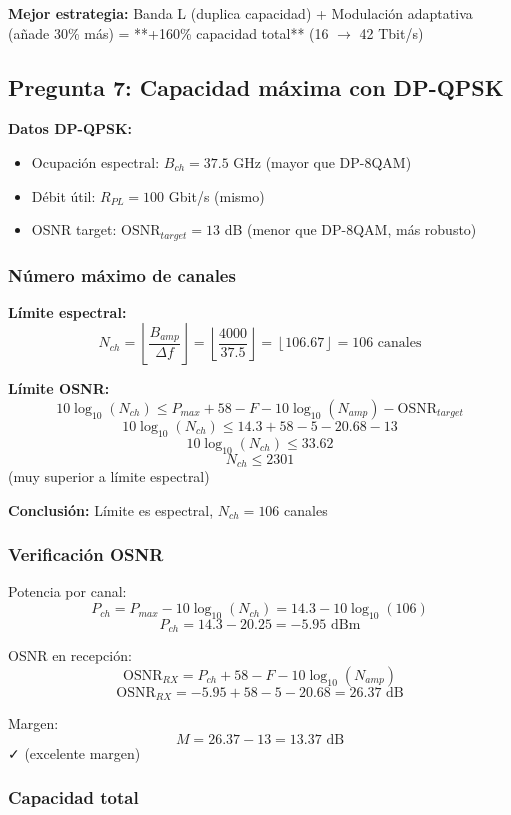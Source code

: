 \documentclass[a4paper,10pt]{article}
\begin{document}
\textbf{Mejor estrategia:} Banda L (duplica capacidad) + Modulación adaptativa (añade 30\% más) = **+160\% capacidad total** (16 $\rightarrow$ 42 Tbit/s)

\subsection{Pregunta 7: Capacidad máxima con DP-QPSK}

\textbf{Datos DP-QPSK:}
\begin{itemize}
    \item Ocupación espectral: $B_{ch} = 37.5$ GHz (mayor que DP-8QAM)
    \item Débit útil: $R_{PL} = 100$ Gbit/s (mismo)
    \item OSNR target: $\text{OSNR}_{target} = 13$ dB (menor que DP-8QAM, más robusto)
\end{itemize}

\subsubsection{Número máximo de canales}

\textbf{Límite espectral:}
$$N_{ch} = \left\lfloor \frac{B_{amp}}{\Delta f} \right\rfloor = \left\lfloor \frac{4000}{37.5} \right\rfloor = \left\lfloor 106.67 \right\rfloor = \boxed{106 \text{ canales}}$$

\textbf{Límite OSNR:}
$$10\log_{10}(N_{ch}) \leq P_{max} + 58 - F - 10\log_{10}(N_{amp}) - \text{OSNR}_{target}$$
$$10\log_{10}(N_{ch}) \leq 14.3 + 58 - 5 - 20.68 - 13$$
$$10\log_{10}(N_{ch}) \leq 33.62$$
$$N_{ch} \leq 2301$$ (muy superior a límite espectral)

\textbf{Conclusión:} Límite es espectral, $N_{ch} = 106$ canales

\subsubsection{Verificación OSNR}

Potencia por canal:
$$P_{ch} = P_{max} - 10\log_{10}(N_{ch}) = 14.3 - 10\log_{10}(106)$$
$$P_{ch} = 14.3 - 20.25 = -5.95 \text{ dBm}$$

OSNR en recepción:
$$\text{OSNR}_{RX} = P_{ch} + 58 - F - 10\log_{10}(N_{amp})$$
$$\text{OSNR}_{RX} = -5.95 + 58 - 5 - 20.68 = 26.37 \text{ dB}$$

Margen:
$$M = 26.37 - 13 = \boxed{13.37 \text{ dB}}$$ ✓ (excelente margen)

\subsubsection{Capacidad total}
\end{document}
